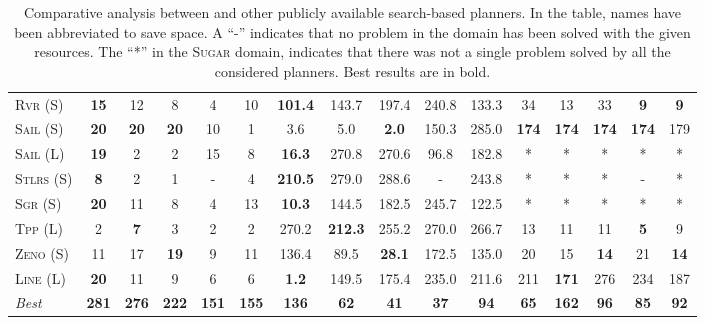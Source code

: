 \documentclass[11pt]{article}
\begin{document}
\begin{table*}[tb]
{\begin{tabular}{|l||ccccc||ccccc||ccccc||}
\textsc{Rvr} (S)&\textbf{15}&12&8&4&10&\textbf{101.4}&143.7&197.4&240.8&133.3&34&13&33&\textbf{9}&\textbf{9}\\
\textsc{Sail} (S)&\textbf{20}&\textbf{20}&\textbf{20}&10&1&3.6&5.0&\textbf{2.0}&150.3&285.0&\textbf{174}&\textbf{174}&\textbf{174}&\textbf{174}&179\\
\textsc{Sail} (L)&\textbf{19}&2&2&15&8&\textbf{16.3}&270.8&270.6&96.8&182.8&*&*&*&*&*\\
\textsc{Stlrs} (S)&\textbf{8}&2&1&-&4&\textbf{210.5}&279.0&288.6&-&243.8&*&*&*&-&*\\
\textsc{Sgr} (S)&\textbf{20}&11&8&4&13&\textbf{10.3}&144.5&182.5&245.7&122.5&*&*&*&*&*\\
\textsc{Tpp} (L)&2&\textbf{7}&3&2&2&270.2&\textbf{212.3}&255.2&270.0&266.7&13&11&11&\textbf{5}&9\\
\textsc{Zeno} (S)&11&17&\textbf{19}&9&11&136.4&89.5&\textbf{28.1}&172.5&135.0&20&15&\textbf{14}&21&\textbf{14}\\
\textsc{Line} (L)&\textbf{20}&11&9&6&6&\textbf{1.2}&149.5&175.4&235.0&211.6&211&\textbf{171}&276&234&187
\\\hline
\textit{Best}&\textbf{281}&\textbf{276}&\textbf{222}&\textbf{151}&\textbf{155}&\textbf{136}&\textbf{62}&\textbf{41}&\textbf{37}&\textbf{94}&\textbf{65}&\textbf{162}&\textbf{96}&\textbf{85}&\textbf{92}\\\hline

        \end{tabular}}
        \caption{Comparative analysis between \pattye and other publicly available search-based planners. In the table, names have been abbreviated to save space. A ``-'' indicates that no problem in the domain has been solved with the given resources. The ``*'' in the \textsc{Sugar} domain, indicates that there was not a single problem solved by all the considered planners. Best results are in bold.}
        \label{tab:search}
        \end{table*}
        
\end{document}
